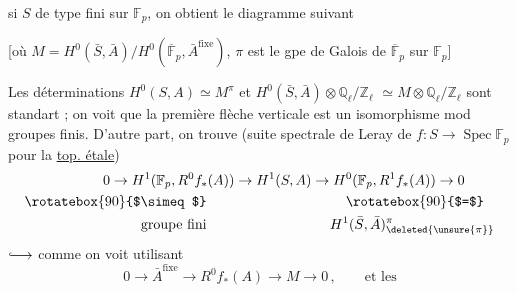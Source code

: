 si $S$ de type fini sur $\mathbb{F}_p$, on obtient %
le diagramme suivant %

[où $M=H^0(\bar S,\bar A)/H^0(\overline{\mathbb{F}}_p,\bar A^{\text{fixe}})$, %
$\pi$ est le gpe de Galois de $\overline{\mathbb{F}}_p$ sur $\mathbb{F}_p$] %

Les déterminations $H^0(S,A)\simeq M^\pi$ et $H^0(\bar S,\bar A)\otimes\mathbb{Q}_\ell/\mathbb{Z}_\ell$ %
$\simeq M\otimes\mathbb{Q}_\ell/\mathbb{Z}_\ell$ sont standart ; on voit que %
la première flèche verticale est un %
isomorphisme mod groupes finis. D'autre part, %
on trouve (suite spectrale de Leray de %
$f:S\to\operatorname{Spec}\mathbb{F}_p$ pour la \uline{top. étale}) %
\[
\begin{aligned}
0\to H^1(\mathbb{F}_p,R^0 f_*(A))&\to H^1(S,A)\to H^0(\mathbb{F}_p,R^1f_*(A))\to0\\ %
\rotatebox{90}{$\simeq$}\qquad&\hspace{28mm}\rotatebox{90}{$=$}\\
\text{groupe fini}\qquad&\hspace{24mm}H^1(\bar S,\bar A)_{\deleted{\unsure{\pi}}}^{\pi}
\end{aligned} %
\]
$\lhook\joinrel\longrightarrow$ comme on voit utilisant %
\[
0\to\bar A^{\text{fixe}}\to R^0f_*(A)\to M\to0\,,\qquad\text{et les} %
\]
